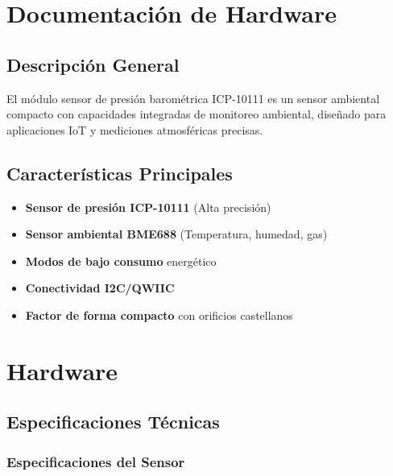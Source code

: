 \documentclass[11pt,a4paper]{article}
\begin{document}

\tableofcontents
\newpage



\listoffigures
\newpage



\listoftables
\newpage




\section{Documentación de Hardware}

\subsection{Descripción General}

El módulo sensor de presión barométrica ICP-10111 es un sensor ambiental compacto con capacidades integradas de monitoreo ambiental, diseñado para aplicaciones IoT y mediciones atmosféricas precisas.

\subsection{Características Principales}

\begin{itemize}
\item \textbf{Sensor de presión ICP-10111} (Alta precisión)
\item \textbf{Sensor ambiental BME688} (Temperatura, humedad, gas)
\item \textbf{Modos de bajo consumo} energético
\item \textbf{Conectividad I2C/QWIIC}
\item \textbf{Factor de forma compacto} con orificios castellanos
\end{itemize}

\section{Hardware}

\subsection{Especificaciones Técnicas}

\subsubsection{Especificaciones del Sensor}
\end{document}
